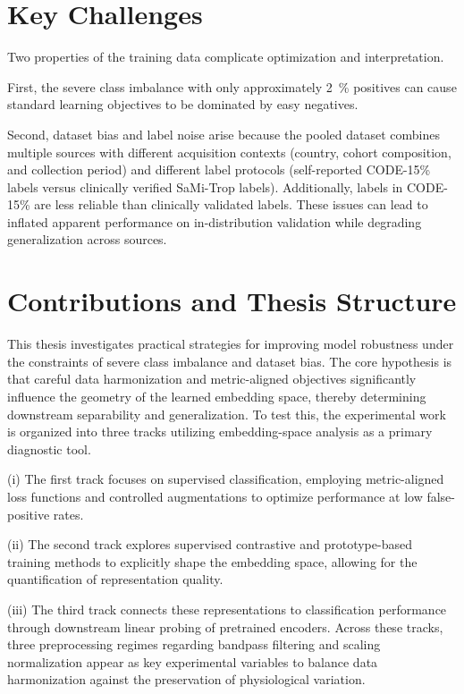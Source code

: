 \section{Key Challenges}
Two properties of the training data complicate optimization and interpretation.

First, the severe class imbalance with only approximately 2~\% positives can cause standard learning objectives to be dominated by easy negatives.

Second, dataset bias and label noise arise because the pooled dataset combines multiple sources with different acquisition contexts (country, cohort composition, and collection period) and different label protocols (self-reported CODE-15\% labels versus clinically verified SaMi-Trop labels).
Additionally, labels in CODE-15\% are less reliable than clinically validated labels.
These issues can lead to inflated apparent performance on in-distribution validation while degrading generalization across sources.

\section{Contributions and Thesis Structure}
This thesis investigates practical strategies for improving model robustness under the constraints of severe class imbalance and dataset bias.
The core hypothesis is that careful data harmonization and metric-aligned objectives significantly influence the geometry of the learned embedding space, thereby determining downstream separability and generalization.
To test this, the experimental work is organized into three tracks utilizing embedding-space analysis as a primary diagnostic tool.

(i) The first track focuses on supervised classification, employing metric-aligned loss functions and controlled augmentations to optimize performance at low false-positive rates.

(ii) The second track explores supervised contrastive and prototype-based training methods to explicitly shape the embedding space, allowing for the quantification of representation quality.

(iii) The third track connects these representations to classification performance through downstream linear probing of pretrained encoders.
Across these tracks, three preprocessing regimes regarding bandpass filtering and scaling normalization appear as key experimental variables to balance data harmonization against the preservation of physiological variation.


